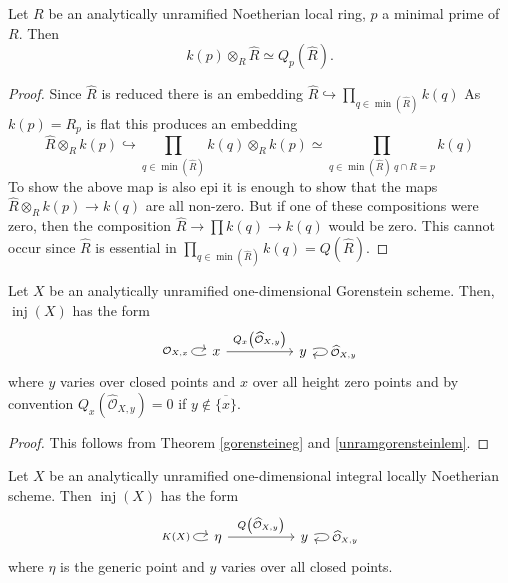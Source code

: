 \documentclass[12pt,oneside]{amsart}
\DeclareMathOperator{\inj}{inj}
\begin{document}
\begin{lemma} \label{unramgorensteinlem}
Let $R$ be an analytically unramified Noetherian local ring, $p$ a minimal prime of $R$. Then 
\[
k(p) \otimes_R \widehat{R} \simeq Q_p(\widehat{R}).
\] 
\end{lemma}

\begin{proof}
Since $\widehat{R}$ is reduced there is an embedding $\widehat{R} \hookrightarrow \prod_{q \in \min(\widehat{R})} k(q)$
As $k(p) = R_p$ is flat this produces an embedding
\[
\widehat{R} \otimes_R k(p) \hookrightarrow \prod_{q \in \min(\widehat{R})} k(q) \otimes_R k(p) \simeq \prod_{q \in \min(\widehat{R}) \ q \cap R = p} k(q)
\]
To show the above map is also epi it is enough to show that the maps $\widehat{R} \otimes_R k(p) \to k(q)$ are all non-zero. But if one of these compositions were zero, then the composition $\widehat{R} \to \prod k(q) \to k(q)$ would be zero. This cannot occur since $\widehat{R}$ is essential in $\prod_{q \in \min(\widehat{R})} k(q) = Q(\widehat{R})$.
\end{proof}


\begin{prop} \label{unramgorielem}
Let $X$ be an analytically unramified one-dimensional Gorenstein scheme. Then, $\inj(X)$ has the form
\[
\begin{tikzcd}[column sep = huge]
x \arrow[r,"{Q_x\left(\widehat{\mathcal{O}}_{X,y}\right)}"] \arrow[loop left,"\mathcal{O}_{X,x}"] & y \arrow[loop right, "\widehat{\mathcal{O}}_{X,y}"]
\end{tikzcd}
\]
where $y$ varies over closed points and $x$ over all height zero points and by convention $Q_x(\widehat{\mathcal{O}}_{X,y}) = 0$ if $y \not \in \overline{\{x\}}$.
\end{prop}

\begin{proof}
This follows from Theorem \ref{gorensteineg} and \ref{unramgorensteinlem}. 
\end{proof}

\begin{prop} \label{unramintegralprop}
Let $X$ be an analytically unramified one-dimensional integral locally Noetherian scheme. Then $\inj(X)$ has the form
\[
\begin{tikzcd}[column sep = huge]
\eta \arrow[r,"{Q\left(\widehat{\mathcal{O}}_{X,y}\right)}"] \arrow[loop left,"K(X)"] & y \arrow[loop right, "\widehat{\mathcal{O}}_{X,y}"]
\end{tikzcd}
\]
where $\eta$ is the generic point and $y$ varies over all closed points. 
\end{prop}
\end{document}
